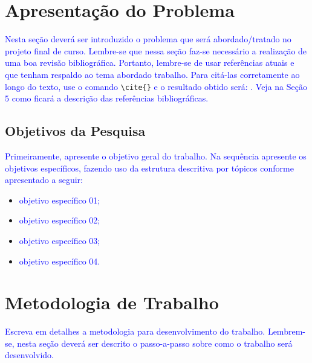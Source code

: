\documentclass[oneside,a4paper,11pt]{article}
\newcommand{\orientacao}[1]{{\textcolor{blue}{#1}}}
\begin{document}
\newpage


\section{Apresentação do Problema}\label{Apresentação do Problema}

\orientacao{Nesta seção deverá ser introduzido o problema que será abordado/tratado no projeto final de curso. Lembre-se que nessa seção faz-se necessário a realização de uma boa revisão bibliográfica. Portanto, lembre-se de usar referências atuais e que tenham respaldo ao tema abordado trabalho. Para citá-las corretamente ao longo do texto, use o comando} \verb!\cite{}! \orientacao{e o resultado obtido será: \cite{Rosa2017}. Veja na Seção $5$ como ficará a descrição das referências bibliográficas.}

\subsection{Objetivos da Pesquisa}\label{Objetivos da Pesquisa}

\orientacao{Primeiramente, apresente o objetivo geral do trabalho. Na sequência apresente os objetivos específicos, fazendo uso da estrutura descritiva por tópicos conforme apresentado a seguir:}

\begin{itemize}
\item \orientacao{objetivo específico 01;}
\item \orientacao{objetivo específico 02;}
\item \orientacao{objetivo específico 03;}
\item \orientacao{objetivo específico 04.}
\end{itemize}

\section{Metodologia de Trabalho}\label{Metodologia de Trabalho}

\orientacao{Escreva em detalhes a metodologia para desenvolvimento do trabalho. Lembrem-se, nesta seção deverá ser descrito o passo-a-passo sobre como o trabalho será desenvolvido.}
\end{document}

